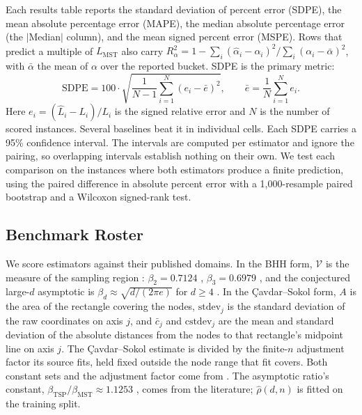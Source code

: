 \documentclass{article}
\begin{document}
Each results table reports the standard deviation of percent error (SDPE), the mean absolute percentage error (MAPE), the median absolute percentage error (the $|$Median$|$ column), and the mean signed percent error (MSPE). Rows that predict a multiple of $L_{\mathrm{MST}}$ also carry $R^2_\alpha=1-\sum_i(\hat\alpha_i-\alpha_i)^2/\sum_i(\alpha_i-\bar\alpha)^2$, with $\bar\alpha$ the mean of $\alpha$ over the reported bucket. SDPE is the primary metric:
\[
\text{SDPE} = 100 \cdot \sqrt{\frac{1}{N-1}\sum_{i=1}^{N}\left(e_i - \bar e\right)^2}, \qquad \bar e = \frac{1}{N}\sum_{i=1}^{N} e_i.
\]
Here $e_i=(\hat L_i-L_i)/L_i$ is the signed relative error and $N$ is the number of scored instances.
 Several baselines beat it in individual cells. Each SDPE carries a 95\%  confidence interval. The intervals are computed per estimator and ignore the pairing, so overlapping intervals establish nothing on their own. We test each comparison on the instances where both estimators produce a finite prediction, using the paired difference in absolute percent error with a 1{,}000-resample paired bootstrap and a Wilcoxon signed-rank test.

\subsection{Benchmark Roster} \label{subsec:bench_models}



We score estimators against their published domains. In the BHH form, $\mathcal{V}$ is the measure of the sampling region \citep{bhh1959}: $\beta_2=0.7124$ \citep{johnson1996asymptotic}, $\beta_3=0.6979$ \citep{percus1996finite}, and the conjectured large-$d$ asymptotic is $\beta_d\approx\sqrt{d/(2\pi e)}$ for $d\ge4$ \citep{bertsimas1990asymptotic}. In the \c{C}avdar--Sokol form, $A$ is the area of the rectangle covering the nodes, $\mathrm{stdev}_j$ is the standard deviation of the raw coordinates on axis $j$, and $\bar c_j$ and $\mathrm{cstdev}_j$ are the mean and standard deviation of the absolute distances from the nodes to that rectangle's midpoint line on axis $j$. The \c{C}avdar--Sokol estimate is divided by the finite-$n$ adjustment factor its source fits, held fixed outside the node range that fit covers. Both constant sets and the adjustment factor come from \citet{cavdar2014dissertation}. The asymptotic ratio's constant, $\beta_{\mathrm{TSP}}/\beta_{\mathrm{MST}}\approx1.1253$ \citep{johnson1996asymptotic,cortinaborja2000mst}, comes from the literature; $\hat\rho(d,n)$ is fitted on the training split.
\end{document}
